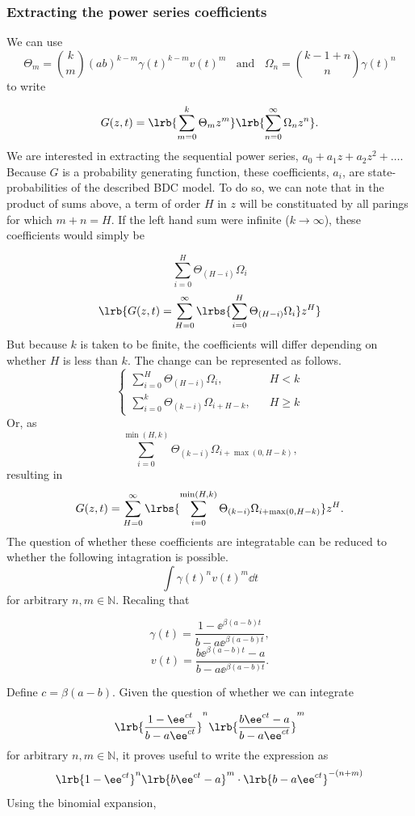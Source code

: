 \subsubsection{Extracting the power series coefficients}

We can use 
$$\Theta_m  = {k \choose m} (ab)^{k-m} \gamma(t)^{k-m} v(t)^m  \;\;\text{ and }\;\; \Omega_n = {k-1+n \choose n} \gamma(t)^n$$
to write

$$G(z,t) = \lrb{\sum^k_{m=0} \Theta_m z^m} \lrb{\sum^{\infty}_{n=0}  \Omega_n z^n}.$$
We are interested in extracting the sequential power series, $a_0 + a_1 z+ a_2z^2+ \dots$. Because $G$ is a probability generating function, these coefficients, $a_i$, are state-probabilities of the described BDC model. To do so, we can note that in the product of sums above, a term of order $H$ in $z$ will be constituated by all parings for which $m+n = H$. If the left hand sum were infinite ($k\to\infty$), these coefficients would simply be

$$\sum^H_{i=0} \Theta_{(H-i)} \Omega_i $$
$$\lrb{G(z,t) = \sum^\infty_{H=0} \lrbs{\sum^H_{i=0} \Theta_{(H-i)} \Omega_i  }z^H   }$$
But because $k$ is taken to be finite, the coefficients will differ depending on whether $H$ is less than $k$. The change can be represented as follows.
$$\begin{cases}
\displaystyle
\sum^H_{i=0} \Theta_{(H-i)} \Omega_i ,&  \hspace{10pt} H<k\\
\displaystyle
\sum^k_{i=0} \Theta_{(k-i)} \Omega_{i+H-k}, &  \hspace{10pt}  H\geq k
\end{cases}$$
Or, as 
$$\sum^{\min(H,k)}_{i=0} \Theta_{(k-i)} \Omega_{i+ \max(0,H-k)},$$
resulting in 
$$G(z, t) =  \sum^\infty_{H=0} \lrbs{\sum^{\min(H,k)}_{i=0} \Theta_{(k-i)} \Omega_{i+ \max(0,H-k)}}z^H.$$
The question of whether these coefficients are integratable can be reduced to whether the following intagration is possible.
$$\int \gamma(t)^n v(t)^m \dd t $$
for arbitrary $n,m\in \mathbb{N}$. Recaling that 

$$\gamma(t) = \frac{1 - \ee^{\beta(a-b) t}}{b - a \ee^{\beta (a-b) t }},$$
$$    v(t) = \frac{ b \ee^{\beta(a-b) t} - a}{    b - a \ee^{\beta (a-b) t } }.$$



\noindent
Define $c =\beta (a-b)$. Given the question of whether we can integrate 

$$\lrb{\frac{1 - \ee^{ct}}{b - a \ee^{ct }}  }^n  \lrb{ \frac{ b \ee^{c t} - a}{    b - a \ee^{ct } } } ^m$$
for arbitrary $n, m \in \mathbb{N}$, it proves useful to write the expression as 
$$\lrb{1 - \ee^{ct}}^n\lrb{b \ee^{ct} - a}^m  \cdot \lrb{  b - a \ee^{c t }}^{-(n+m)}$$
Using the binomial expansion,

